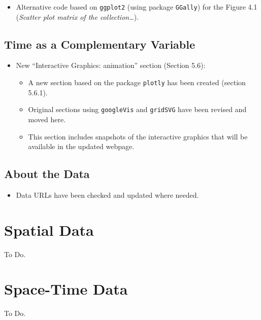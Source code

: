 \documentclass[11pt]{article}
\begin{document}
\begin{itemize}
\item Alternative code based on \texttt{ggplot2} (using package \texttt{GGally}) for the Figure 4.1 (\emph{Scatter plot matrix of the collection\ldots{}}).
\end{itemize}

\subsection*{Time as a Complementary Variable}
\label{sec:org4420047}

\begin{itemize}
\item New ``Interactive Graphics: animation'' section (Section 5.6):
\begin{itemize}
\item A new section based on the package \texttt{plotly} has been created (section 5.6.1).
\item Original sections using \texttt{googleVis} and \texttt{gridSVG} have been revised and moved here.
\item This section includes snapshots of the interactive graphics that will be available in the updated webpage.
\end{itemize}
\end{itemize}

\subsection*{About the Data}
\label{sec:orgf0f01e5}
\begin{itemize}
\item Data URLs have been checked and updated where needed.
\end{itemize}

\section*{Spatial Data}
\label{sec:org9a5e11b}

To Do.
\section*{Space-Time Data}
\label{sec:org8905af4}
To Do.
\end{document}
